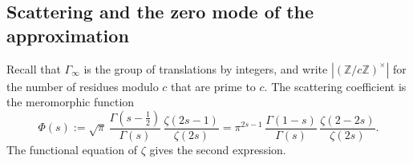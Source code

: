 \subsection{Scattering and the zero mode of the approximation}\label{subsec:ev-scattering}
Recall that $\Gamma_\infty$ is the group of translations by integers, and write $|(\mathbb Z/c\mathbb Z)^\times|$ for the number of
residues modulo $c$ that are prime to $c$. The scattering coefficient is the meromorphic function
\begin{equation}\label{ev:Phi}
  \Phi(s):=\sqrt\pi\,\frac{\Gamma(s-\frac12)}{\Gamma(s)}\,\frac{\zeta(2s-1)}{\zeta(2s)}
  =\pi^{2s-1}\,\frac{\Gamma(1-s)}{\Gamma(s)}\,\frac{\zeta(2-2s)}{\zeta(2s)} .
\end{equation}
The functional equation of $\zeta$ gives the second expression.

